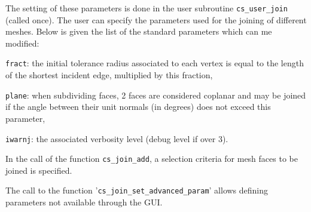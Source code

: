 {{{{The setting of these parameters is done in the user subroutine \texttt{cs\_user\_join} (called once). The user can specify the parameters used for the joining of different meshes. Below is given the list of the standard parameters which can me modified:
\begin{list}{-}{}
\item \texttt{fract}: the initial tolerance radius associated to each vertex is equal to the length of the shortest incident edge, multiplied by this fraction,
\item \texttt{plane}: when subdividing faces, 2 faces are considered coplanar and may be joined if the angle between their unit normals (in degrees) does not exceed this parameter,
\item \texttt{iwarnj}: the associated verbosity level (debug level if over 3).
\end{list}
In the call of the function \texttt{cs\_join\_add}, a selection criteria for
mesh faces to be joined is specified.

The call to the function '\texttt{cs\_join\_set\_advanced\_param}' allows defining parameters not available through the GUI.

}}}}
